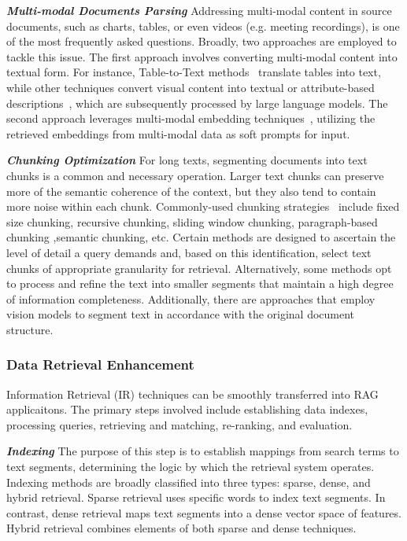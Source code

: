 \textit{\textbf{Multi-modal Documents Parsing}} Addressing multi-modal content in source documents, such as charts, tables, or even videos (e.g. meeting recordings), is one of the most frequently asked questions. Broadly, two approaches are employed to tackle this issue. The first approach involves converting multi-modal content into textual form. For instance, Table-to-Text methods~\cite{min2024exploring} translate tables into text, while other techniques convert visual content into textual or attribute-based descriptions~\cite{suris2023vipergpt, gao2023assistgpt}, which are subsequently processed by large language models. The second approach leverages multi-modal embedding techniques~\cite{hu2023reveal, li2022blip, long2024generative}, utilizing the retrieved embeddings from multi-modal data as soft prompts for input.


\textit{\textbf{Chunking Optimization}} For long texts, segmenting documents into text chunks is a common and necessary operation. Larger text chunks can preserve more of the semantic coherence of the context, but they also tend to contain more noise within each chunk\cite{liu2024lost}. Commonly-used chunking strategies~\cite{langchain_chunk, llamaindex_chunk} include fixed size chunking, recursive chunking, sliding window chunking, paragraph-based chunking ,semantic chunking, etc. Certain methods are designed to ascertain the level of detail a query demands and, based on this identification, select text chunks of appropriate granularity for retrieval\cite{sarthi2024raptor, zhong2024mix}. Alternatively, some methods opt to process and refine the text into smaller segments that maintain a high degree of information completeness\cite{chen2023dense}. Additionally, there are approaches that employ vision models to segment text in accordance with the original document structure\cite{yepes2024financial}.


\textit{\textbf{}} 
\subsubsection{Data Retrieval Enhancement}
Information Retrieval (IR) techniques can be smoothly transferred into RAG applicaitons. The primary steps involved include establishing data indexes, processing queries, retrieving and matching, re-ranking, and evaluation. 


\textit{\textbf{Indexing}} The purpose of this step is to establish mappings from search terms to text segments, determining the logic by which the retrieval system operates. Indexing methods are broadly classified into three types: sparse, dense, and hybrid retrieval. Sparse retrieval uses specific words to index text segments. In contrast, dense retrieval maps text segments into a dense vector space of features. Hybrid retrieval combines elements of both sparse and dense techniques.

